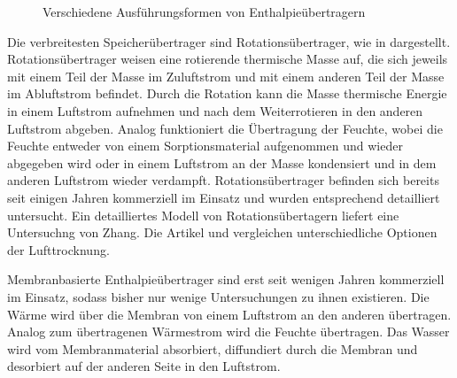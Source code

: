 \begin{figure} [h]
	\caption{Verschiedene Ausführungsformen von Enthalpieübertragern}
	\label{fig:Enthalpieübertrager}
	
\end{figure}


Die verbreitesten Speicherübertrager sind Rotationsübertrager, wie in dargestellt. Rotationsübertrager weisen eine rotierende thermische Masse auf, die sich jeweils mit einem Teil der Masse im Zuluftstrom und mit einem anderen Teil der Masse im Abluftstrom befindet. Durch die Rotation kann die Masse thermische Energie in einem Luftstrom aufnehmen und nach dem Weiterrotieren in den anderen Luftstrom abgeben. Analog funktioniert die Übertragung der Feuchte, wobei die Feuchte entweder von einem Sorptionsmaterial aufgenommen und wieder abgegeben wird oder in einem Luftstrom an der Masse kondensiert und in dem anderen Luftstrom wieder verdampft. Rotationsübertrager befinden sich bereits seit einigen Jahren kommerziell im Einsatz und wurden entsprechend detailliert untersucht. Ein detailliertes Modell von Rotationsübertagern liefert eine Untersuchng von Zhang\cite{Zhang.2002}. Die Artikel \cite{Zhang.2006} und \cite{JustoAlonso.2015} vergleichen unterschiedliche Optionen der Lufttrocknung.

Membranbasierte Enthalpieübertrager sind erst seit wenigen Jahren kommerziell im Einsatz, sodass bisher nur wenige Untersuchungen zu ihnen existieren. Die Wärme wird über die Membran von einem Luftstrom an den anderen übertragen. Analog zum übertragenen Wärmestrom wird die Feuchte übertragen. Das Wasser wird vom Membranmaterial absorbiert, diffundiert durch die Membran und desorbiert auf der anderen Seite in den Luftstrom. 

